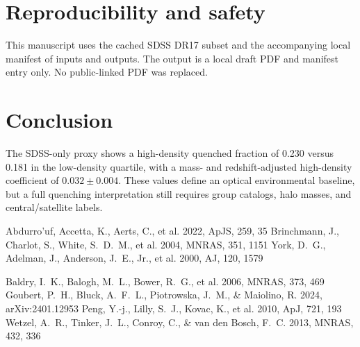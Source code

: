 \documentclass[twocolumn]{aastex631}
\begin{document}
\section{Reproducibility and safety}\label{sec:repro}
This manuscript uses the cached SDSS DR17 subset and the accompanying local manifest of inputs and outputs. The output is a local draft PDF and manifest entry only. No public-linked PDF was replaced.

\section{Conclusion}\label{sec:conclusion}
The SDSS-only proxy shows a high-density quenched fraction of 0.230 versus 0.181 in the low-density quartile, with a mass- and redshift-adjusted high-density coefficient of $0.032 \pm 0.004$. These values define an optical environmental baseline, but a full quenching interpretation still requires group catalogs, halo masses, and central/satellite labels.


\begin{thebibliography}{}
 Abdurro'uf, Accetta, K., Aerts, C., et al. 2022, ApJS, 259, 35
 Brinchmann, J., Charlot, S., White, S.~D.~M., et al. 2004, MNRAS, 351, 1151
 York, D.~G., Adelman, J., Anderson, J.~E., Jr., et al. 2000, AJ, 120, 1579

 Baldry, I.~K., Balogh, M.~L., Bower, R.~G., et al. 2006, MNRAS, 373, 469
 Goubert, P.~H., Bluck, A.~F.~L., Piotrowska, J.~M., \& Maiolino, R. 2024, arXiv:2401.12953
 Peng, Y.-j., Lilly, S.~J., Kovac, K., et al. 2010, ApJ, 721, 193
 Wetzel, A.~R., Tinker, J.~L., Conroy, C., \& van den Bosch, F.~C. 2013, MNRAS, 432, 336
\end{thebibliography}
\end{document}
